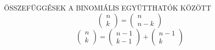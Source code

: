 \begin{tetel}{ÖSSZEFÜGGÉSEK A BINOMIÁLIS EGYÜTTHATÓK KÖZÖTT}
$$
\begin{pmatrix}
n\\k
\end{pmatrix} = \begin{pmatrix}
n\\n-k
\end{pmatrix}
$$
$$
\begin{pmatrix}
n\\k
\end{pmatrix} = \begin{pmatrix}
n-1\\k-1
\end{pmatrix} + \begin{pmatrix}
n-1\\k
\end{pmatrix}
$$
\end{tetel}
